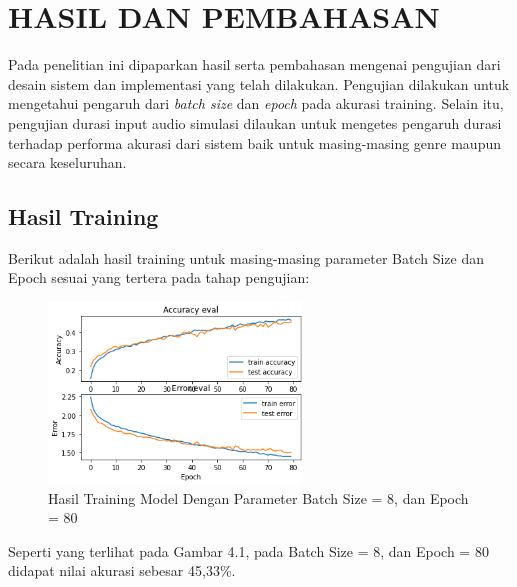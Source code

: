 \chapter{HASIL DAN PEMBAHASAN}
\label{chap:hasilpembahasan}


Pada penelitian ini dipaparkan hasil serta pembahasan mengenai pengujian dari desain sistem dan implementasi yang telah dilakukan. Pengujian dilakukan untuk mengetahui pengaruh dari \emph{batch size} dan \emph{epoch} pada akurasi training. Selain itu, pengujian durasi input audio simulasi dilaukan untuk mengetes pengaruh durasi terhadap performa akurasi dari sistem baik untuk masing-masing genre maupun secara keseluruhan.

\section{Hasil Training}
\label{sec:hasiltraining}
Berikut adalah hasil training untuk masing-masing parameter Batch Size dan Epoch sesuai yang tertera pada tahap pengujian:

\begin{figure}[H]
	\centering
	
	\includegraphics[width=0.6\textwidth]{gambar/b8_e80}
	
	\caption{Hasil Training Model Dengan Parameter Batch Size = 8, dan Epoch = 80}
	\label{fig:b8_e80}
\end{figure}

Seperti yang terlihat pada Gambar 4.1, pada Batch Size = 8, dan Epoch = 80 didapat nilai akurasi sebesar 45,33\%.

